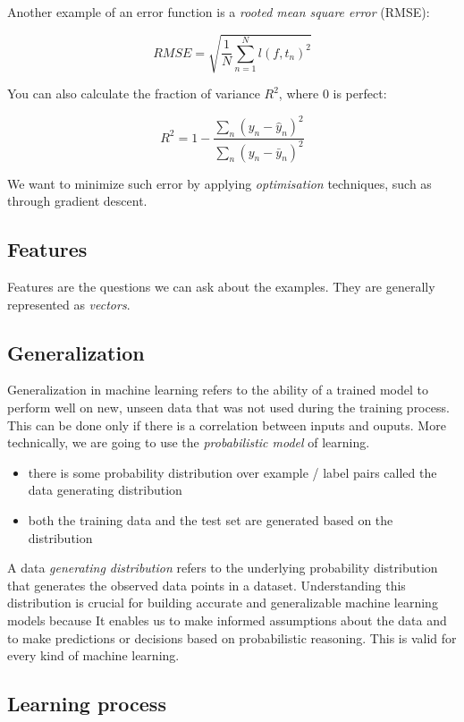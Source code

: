 \documentclass{article}
\begin{document}
Another example of an error function is a \emph{rooted mean square
error} (RMSE):

\[RMSE = \sqrt{\frac{1}{N}\sum_{n=1}^N l(f, t_n)^2}\]

You can also calculate the fraction of variance \(R^2\), where 0 is
perfect:

\[R^2 = 1 - \frac{\sum_n (y_n - \hat{y}_n)^2}{\sum_n (y_n - \bar{y}_n)^2}\]

We want to minimize such error by applying \emph{optimisation}
techniques, such as through gradient descent.

\subsection{Features}\label{features}

Features are the questions we can ask about the examples. They are
generally represented as \emph{vectors}.

\subsection{Generalization}\label{generalization}

Generalization in machine learning refers to the ability of a trained
model to perform well on new, unseen data that was not used during the
training process. This can be done only if there is a correlation
between inputs and ouputs. More technically, we are going to use the
\emph{probabilistic model} of learning.

\begin{itemize}
\tightlist
\item
  there is some probability distribution over example / label pairs
  called the data generating distribution
\item
  both the training data and the test set are generated based on the
  distribution
\end{itemize}

A data \emph{generating distribution} refers to the underlying
probability distribution that generates the observed data points in a
dataset. Understanding this distribution is crucial for building
accurate and generalizable machine learning models because It enables us
to make informed assumptions about the data and to make predictions or
decisions based on probabilistic reasoning. This is valid for every kind
of machine learning.

\subsection{Learning process}\label{learning-process}
\end{document}
